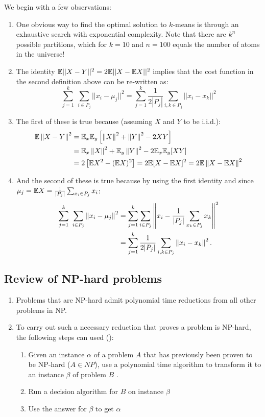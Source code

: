 \noindent We begin with a few observations:
\begin{enumerate}
\item One obvious way to find the optimal solution to $k$-means is
  through an exhaustive search with exponential complexity. Note that there are $k^n$ possible
  partitions, which for $k=10$ and $n=100$ equals the number of atoms
  in the universe! 
\item The identity $\mathbb{E} || X - Y ||^2 = 2 \mathbb{E} || X- \mathbb{E} X ||^2$ implies
  that the cost function in the second definition above can be
  re-written as:  $$\sum_{j=1}^{k} \ \sum_{i\in P_j} || x_i - \mu_j ||
  ^2 = \sum_{j=1}^{k} \frac{1}{2 |P_j|} \sum_{i,k \in P_j} || x_i -
  x_k || ^2 $$ 
\item The first of these is true because (assuming $X$ and $Y$ to be
  i.i.d.): 
\begin{align*}
  \mathbb{E}\left\lVert X - Y\right\rVert^2 &= \mathbb{E}_x \mathbb{E}_{y} \left[\left\lVert X\right\rVert^2 + \left\lVert Y\right\rVert^2 - 2
    XY \right] \\ 
  &= \mathbb{E}_x \left\lVert X\right\rVert^2 + \mathbb{E}_y\left\lVert Y\right\rVert^2 -2 \mathbb{E}_x \mathbb{E}_y [ X Y ] \\
  &= 2 \left[ \mathbb{E} X^2 - (\mathbb{E} X)^2\right] = 2 \mathbb{E} [ X - \mathbb{E} X ]^2 = 2
  \mathbb{E}\left\lVert X- \mathbb{E} X\right\rVert^2 
\end{align*}
\item And the second of these is true because by using the first
  identity and since $\mu_j = \mathbb{E} X = \frac{1}{|P_j|} \sum_{x_i \in
    P_j} x_i$: 
\begin{align*}
	\sum_{j=1}^{k} \ \sum_{i\in P_j} \left\lVert x_i - \mu_j\right\rVert^2 &=
        \sum_{j=1}^{k}  \sum_{i\in P_j} \left\lVert x_i - \frac{1}{|P_j|}
        \sum_{x_k \in P_j} x_k\right\rVert^2 \\
        & = \sum_{j=1}^{k} \frac{1}{2 |P_j|} \sum_{i,k \in P_j}
        \left\lVert x_i - x_k\right\rVert^2.
\end{align*}
\end{enumerate}

\subsection{Review of NP-hard problems}
\begin{enumerate}
\item Problems that are NP-hard admit polynomial time
  reductions from all other problems in NP.
\item To carry out such a necessary reduction that proves a problem is NP-hard, the following steps can used (\cite{cor2009}): 
\begin{enumerate}
\item Given an instance $\alpha$ of a problem $A$ that has previously
  been proven to be NP-hard ($A \in NP$), use a polynomial time algorithm to transform it to an instance $\beta$ of problem $B$ .
\item Run a decision algorithm for $B$ on instance $\beta$ 
\item Use the answer for $\beta$ to get $\alpha$
\end{enumerate} 
\end{enumerate} 

